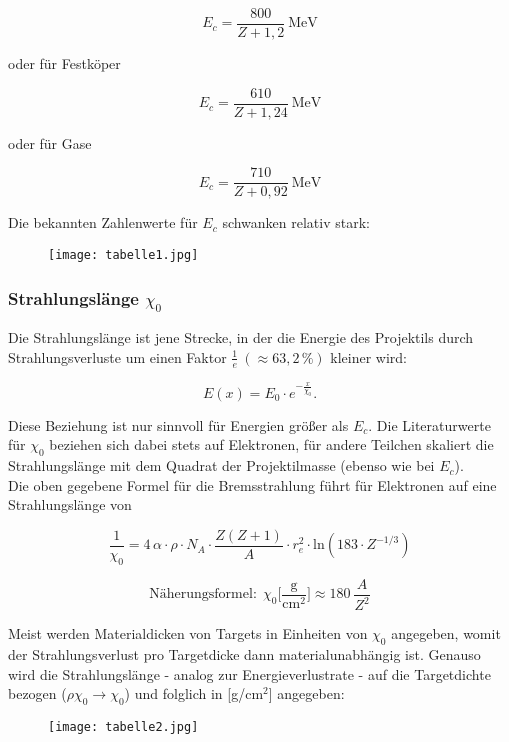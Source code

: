 \[E_c = \frac{800}{Z+1{,}2}~\text{MeV} \]

oder für Festköper

\[E_c = \frac{610}{Z+1{,}24}~\text{MeV} \]

oder für Gase

\[E_c = \frac{710}{Z+0{,}92}~\text{MeV} \]


Die bekannten Zahlenwerte für $E_c$ schwanken relativ stark:

\begin{figure}[H]
	\centering
	\texttt{[image: tabelle1.jpg]}
\end{figure}

\subsubsection*{Strahlungslänge $\chi_0$}

Die Strahlungslänge ist jene Strecke, in der die Energie des Projektils durch Strahlungsverluste um
einen Faktor $\frac{1}{e}~(\approx63{,}2\,\%)$ kleiner wird:

\[E(x)=E_0\cdot e^{-\frac{x}{\chi_0}}.\]

Diese Beziehung ist nur sinnvoll für Energien größer als $E_c$. Die Literaturwerte für $\chi_0$
beziehen sich dabei stets auf Elektronen, für andere Teilchen skaliert die Strahlungslänge mit dem
Quadrat der Projektilmasse (ebenso wie bei $E_c$).
\\
Die oben gegebene Formel für die Bremsstrahlung führt für Elektronen auf eine Strahlungslänge
von 

\[\frac{1}{\chi_0}=4\,\alpha\cdot \rho\cdot N_A \cdot\frac{Z(Z+1)}{A}\cdot
r_e^2\cdot\text{ln}\left(183\cdot Z^{-1/3}\right)\]

\[\text{Näherungsformel:}~~\chi_0\bigg[\frac{\text{g}}{\text{cm}^2}\bigg] \approx
180~\frac{A}{Z^2}\] 

Meist werden Materialdicken von Targets in Einheiten von $\chi_0$ angegeben, womit der
Strahlungsverlust pro Targetdicke dann materialunabhängig ist. Genauso wird die Strahlungslänge -
analog zur Energieverlustrate - auf die Targetdichte bezogen ($\rho \chi_0\rightarrow\chi_0$) und
folglich in [g/cm$^2$] angegeben:

\begin{figure}[H]
	\centering
	\texttt{[image: tabelle2.jpg]}
\end{figure}

\FloatBarrier